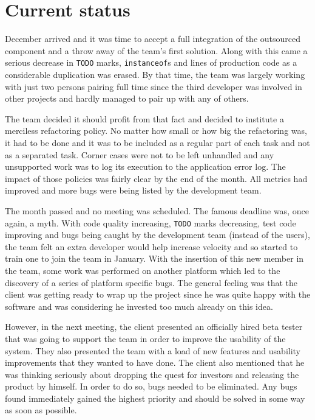 \documentclass[lnbip]{svmultln}
\begin{document}
\section{Current status}
\label{sec:nowadays}

December arrived and it was time to accept a full integration of the
outsourced component and a throw away of the team's first
solution. Along with this came a serious decrease in \texttt{TODO}
marks, \texttt{instanceof}s and lines of production code as a
considerable duplication was erased. By that time, the team was
largely working with just two persons pairing full time since the
third developer was involved in other projects and hardly managed to
pair up with any of others.

The team decided it should profit from that fact and decided to
institute a merciless refactoring policy. No matter how small or how
big the refactoring was, it had to be done and it was to be included
as a regular part of each task and not as a separated task. Corner
cases were not to be left unhandled and any unsupported work was to
log its execution to the application error log. The impact of those
policies was fairly clear by the end of the month. All metrics had
improved and more bugs were being listed by the development team.

The month passed and no meeting was scheduled. The famous deadline
was, once again, a myth. With code quality increasing, \texttt{TODO}
marks decreasing, test code improving and bugs being caught by the
development team (instead of the users), the team felt an extra
developer would help increase velocity and so started to train one to
join the team in January. With the insertion of this new member in the
team, some work was performed on another platform which led to the
discovery of a series of platform specific bugs. The general feeling
was that the client was getting ready to wrap up the project since he
was quite happy with the software and was considering he invested too
much already on this idea.

However, in the next meeting, the client presented an officially hired
beta tester that was going to support the team in order to improve the
usability of the system. They also presented the team with a load of
new features and usability improvements that they wanted to have
done. The client also mentioned that he was thinking seriously about
dropping the quest for investors and releasing the product by
himself. In order to do so, bugs needed to be eliminated. Any bugs
found immediately gained the highest priority and should be solved in
some way as soon as possible.
\end{document}
